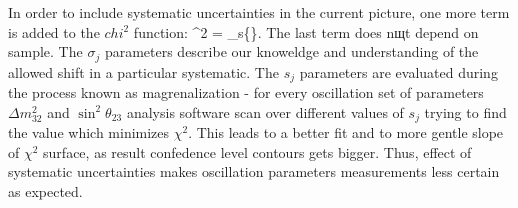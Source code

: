 In order to include systematic uncertainties in the current picture, one more term is added to the $chi^2$ 
function:
\be
\chi^2 = \sum_{s\in\{\}}.
\ee
The last term does nщt depend on sample. The $\sigma_j$ parameters describe our knoweldge and understanding of
the allowed shift in a particular systematic. The $s_j$ parameters are evaluated during the process known as
magrenalization - for every oscillation set of parameters $\Delta m^2_{32}$ and $\sin^2\theta_{23}$ analysis
software scan over different values of $s_j$ trying to find the value which minimizes $\chi^2$. This 
leads to a better fit and to more gentle slope of $\chi^2$ surface, as result confedence level contours gets 
bigger. Thus, effect of systematic uncertainties makes oscillation parameters measurements less certain as 
expected. 
